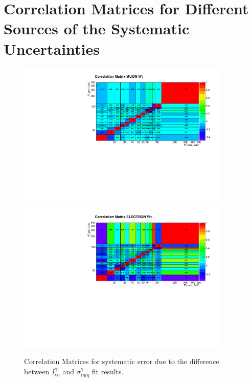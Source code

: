 \chapter{Correlation Matrices for Different Sources of the Systematic Uncertainties}
\label{sec:corrMatrices}

\begin{figure}[htb]
  \begin{center}
   \includegraphics[width=0.90\textwidth]{../figs/figs_v11/MUON_WGamma/Constants/matrCorrelation_syst_CHISOvsSIHIH.pdf}\\
\includegraphics[width=0.90\textwidth]{../figs/figs_v11/ELECTRON_WGamma/Constants/matrCorrelation_syst_CHISOvsSIHIH.pdf}
  \caption{Correlation Matrices for systematic error due to the difference between $I_{ch}^{\gamma}$ and $\sigma_{i\eta i\eta}^{\gamma}$ fit results.}
  \label{fig:corrMatrices_syst_CHISOvsSIHIH_Wg}
  \end{center}
\end{figure}

